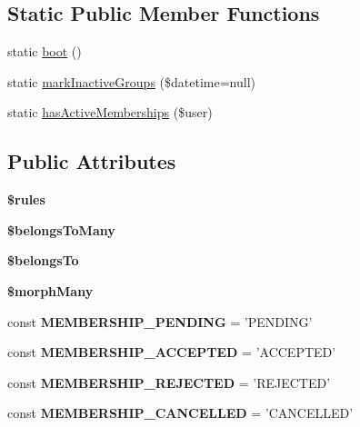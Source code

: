 \subsection*{Static Public Member Functions}
\begin{DoxyCompactItemize}
\item 
static \hyperlink{classDMA_1_1Friends_1_1Models_1_1UserGroup_a556c5f9443e270feb7824c30de13b85f}{boot} ()
\item 
static \hyperlink{classDMA_1_1Friends_1_1Models_1_1UserGroup_a869b9c67b74345d970d62c9fba9f9d2d}{mark\-Inactive\-Groups} (\$datetime=null)
\item 
static \hyperlink{classDMA_1_1Friends_1_1Models_1_1UserGroup_a98977f281ed3d9dc85220af0207c764d}{has\-Active\-Memberships} (\$user)
\end{DoxyCompactItemize}
\subsection*{Public Attributes}
\begin{DoxyCompactItemize}
\item 
{\bfseries \$rules}
\item 
{\bfseries \$belongs\-To\-Many}
\item 
{\bfseries \$belongs\-To}
\item 
{\bfseries \$morph\-Many}
\item 
\hypertarget{classDMA_1_1Friends_1_1Models_1_1UserGroup_a7c8222c3e74df7e5f392db954bc6e70b}{const {\bfseries M\-E\-M\-B\-E\-R\-S\-H\-I\-P\-\_\-\-P\-E\-N\-D\-I\-N\-G} = 'P\-E\-N\-D\-I\-N\-G'}\label{classDMA_1_1Friends_1_1Models_1_1UserGroup_a7c8222c3e74df7e5f392db954bc6e70b}

\item 
\hypertarget{classDMA_1_1Friends_1_1Models_1_1UserGroup_a7c23f715047baa55b359250eb7ec3936}{const {\bfseries M\-E\-M\-B\-E\-R\-S\-H\-I\-P\-\_\-\-A\-C\-C\-E\-P\-T\-E\-D} = 'A\-C\-C\-E\-P\-T\-E\-D'}\label{classDMA_1_1Friends_1_1Models_1_1UserGroup_a7c23f715047baa55b359250eb7ec3936}

\item 
\hypertarget{classDMA_1_1Friends_1_1Models_1_1UserGroup_a4d38303c9b869050114862be4674191f}{const {\bfseries M\-E\-M\-B\-E\-R\-S\-H\-I\-P\-\_\-\-R\-E\-J\-E\-C\-T\-E\-D} = 'R\-E\-J\-E\-C\-T\-E\-D'}\label{classDMA_1_1Friends_1_1Models_1_1UserGroup_a4d38303c9b869050114862be4674191f}

\item 
\hypertarget{classDMA_1_1Friends_1_1Models_1_1UserGroup_a40fdb6407bcd12e19a13706ced558e40}{const {\bfseries M\-E\-M\-B\-E\-R\-S\-H\-I\-P\-\_\-\-C\-A\-N\-C\-E\-L\-L\-E\-D} = 'C\-A\-N\-C\-E\-L\-L\-E\-D'}\label{classDMA_1_1Friends_1_1Models_1_1UserGroup_a40fdb6407bcd12e19a13706ced558e40}

\end{DoxyCompactItemize}
